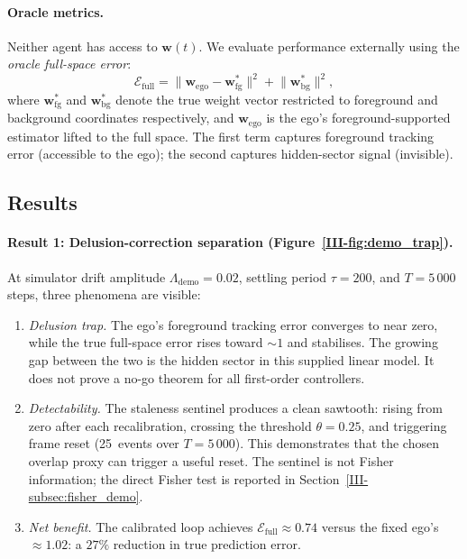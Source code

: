 \documentclass[12pt,a4paper,openany]{book}
\begin{document}
\paragraph{Oracle metrics.}
Neither agent has access to $\mathbf{w}(t)$.
We evaluate performance externally using the \emph{oracle
full-space error}:
\begin{equation}
\label{III-eq:oracle_error}
\mathcal{E}_{\mathrm{full}}
= \bigl\|\mathbf{w}_{\mathrm{ego}}
  - \mathbf{w}^*_{\mathrm{fg}}\bigr\|^2
+ \bigl\|\mathbf{w}^*_{\mathrm{bg}}\bigr\|^2,
\end{equation}
where $\mathbf{w}^*_{\mathrm{fg}}$ and
$\mathbf{w}^*_{\mathrm{bg}}$ denote the true weight vector
restricted to foreground and background coordinates
respectively, and $\mathbf{w}_{\mathrm{ego}}$ is the ego's
foreground-supported estimator lifted to the full space.
The first term captures foreground tracking error (accessible
to the ego); the second captures hidden-sector signal
(invisible).

\subsection{Results}
\label{III-subsec:demo_results}

\paragraph{Result 1: Delusion-correction separation
(Figure~\ref{III-fig:demo_trap}).}
At simulator drift amplitude $\Lambda_{\mathrm{demo}} = 0.02$,
settling period $\tau = 200$,
and $T = 5\,000$ steps, three phenomena are visible:

\begin{enumerate}
\item[(a)]
\emph{Delusion trap.}
The ego's foreground tracking error converges
to near zero, while the true full-space error rises
toward $\sim\!1$ and stabilises.
The growing gap between the two is the hidden sector in this supplied
linear model.  It does not prove a no-go theorem for all first-order
controllers.

\item[(b)]
\emph{Detectability.}
The staleness sentinel produces a clean sawtooth:
rising from zero after each recalibration, crossing the
threshold $\theta = 0.25$, and triggering frame reset
(25~events over $T = 5\,000$).
This demonstrates that the chosen overlap proxy can trigger a useful
reset.  The sentinel is not Fisher information; the direct Fisher test
is reported in Section~\ref{III-subsec:fisher_demo}.

\item[(c)]
\emph{Net benefit.}
The calibrated loop achieves
$\mathcal{E}_{\mathrm{full}} \approx 0.74$
versus the fixed ego's $\approx 1.02$:
a $27\%$ reduction in true prediction error.
\end{enumerate}
\end{document}
